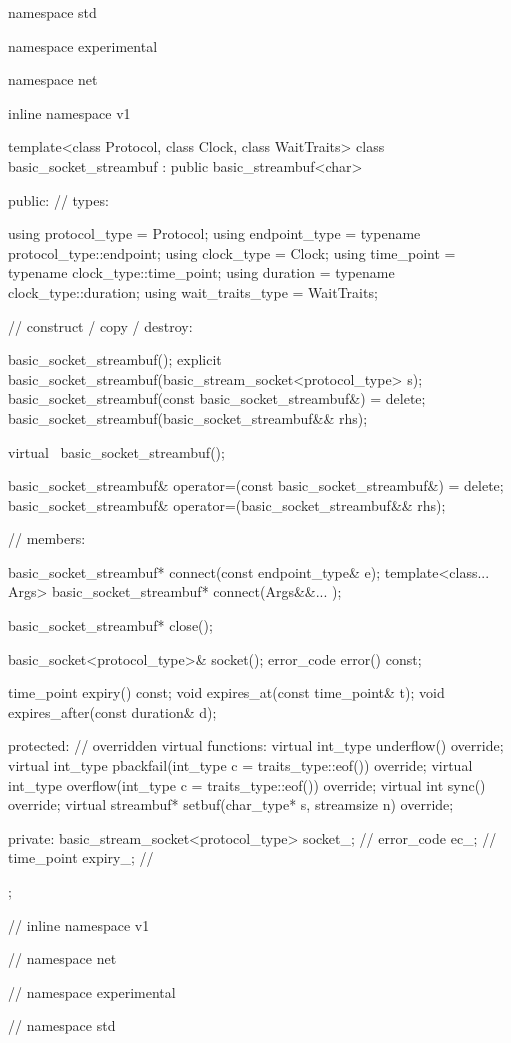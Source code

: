 \begin{codeblock}
namespace std {
namespace experimental {
namespace net {
inline namespace v1 {

  template<class Protocol, class Clock, class WaitTraits>
  class basic_socket_streambuf : public basic_streambuf<char>
  {
  public:
    // types:

    using protocol_type = Protocol;
    using endpoint_type = typename protocol_type::endpoint;
    using clock_type = Clock;
    using time_point = typename clock_type::time_point;
    using duration = typename clock_type::duration;
    using wait_traits_type = WaitTraits;

    // construct / copy / destroy:

    basic_socket_streambuf();
    explicit basic_socket_streambuf(basic_stream_socket<protocol_type> s);
    basic_socket_streambuf(const basic_socket_streambuf&) = delete;
    basic_socket_streambuf(basic_socket_streambuf&& rhs);

    virtual ~basic_socket_streambuf();

    basic_socket_streambuf& operator=(const basic_socket_streambuf&) = delete;
    basic_socket_streambuf& operator=(basic_socket_streambuf&& rhs);

    // members:

    basic_socket_streambuf* connect(const endpoint_type& e);
    template<class... Args> basic_socket_streambuf* connect(Args&&... );

    basic_socket_streambuf* close();

    basic_socket<protocol_type>& socket();
    error_code error() const;

    time_point expiry() const;
    void expires_at(const time_point& t);
    void expires_after(const duration& d);

  protected:
    // overridden virtual functions:
    virtual int_type underflow() override;
    virtual int_type pbackfail(int_type c = traits_type::eof()) override;
    virtual int_type overflow(int_type c = traits_type::eof()) override;
    virtual int sync() override;
    virtual streambuf* setbuf(char_type* s, streamsize n) override;

  private:
    basic_stream_socket<protocol_type> socket_; // \expos
    error_code ec_; // \expos
    time_point expiry_; // \expos
  };

} // inline namespace v1
} // namespace net
} // namespace experimental
} // namespace std
\end{codeblock}

